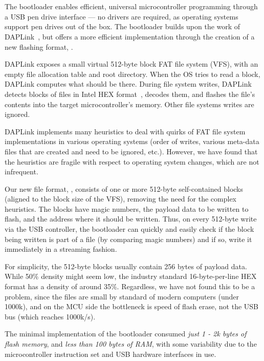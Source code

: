 \section{\UF}
\label{sec:uf2}

The \UF bootloader enables efficient, universal microcontroller programming through a USB pen drive interface --- no drivers are required, as operating systems support pen drives out of the box. The \UF bootloader builds upon the work of DAPLink~\cite{GitHubAR5:online}, but offers a more efficient implementation through the creation of a new flashing format, \UF.

DAPLink exposes a small virtual 512-byte block FAT file system (VFS), with an empty file allocation table and root directory. When the OS tries to read a block, DAPLink computes what should be there. During file system writes, DAPLink detects blocks of files in Intel HEX format~\cite{IntelHEX}, decodes them, and flashes the file's contents into the target microcontroller's memory. Other file systems writes are ignored.

DAPLink implements many heuristics to deal with quirks of FAT file
system implementations in various operating systems (order of writes, various meta-data files that are created and need to be ignored, etc.).  However, we have found that the heuristics are fragile with respect to operating system changes, which are not infrequent.

Our new file format, \UF, consists of one or more 512-byte self-contained blocks (aligned to the block size of the VFS), removing the need for the complex heuristics. The blocks have magic numbers, the payload data to be written to flash, and the address where it should be written. Thus, on every 512-byte write via the USB controller, the bootloader can quickly and easily check if the block being written is part of a \UF file (by comparing magic numbers) and if so, write it immediately in a streaming fashion. 

For simplicity, the 512-byte \UF blocks usually contain 256 bytes of payload data. While 50\% density might seem low, the industry standard 16-byte-per-line HEX format has a density of around 35\%. Regardless, we have not found this to be a problem, since the files are small by standard of modern computers (under 1000k), and on the MCU side the bottleneck is speed of flash erase, not the USB bus (which reaches 1000k/s).

The minimal implementation of the \UF bootloader consumed \emph{just 1 - 2k bytes of flash memory}, and \emph{less than 100 bytes of RAM}, with some variability due to the microcontroller instruction set and USB hardware interfaces in use.

